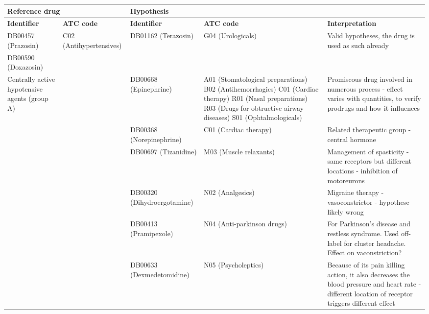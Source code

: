 \begin{table}[htbp]
\scriptsize
\begin{tabular}{|p{2cm}|p{2cm}|p{2cm}|p{2cm}|p{2cm}|}
\hline
\multicolumn{ 2}{|p{2cm}|}{\textbf{Reference drug}} & \multicolumn{ 2}{p{2cm}|}{\textbf{Hypothesis}} &  \\ \hline
\textbf{Identifier} & \textbf{ATC code} & \textbf{Identifier} & \textbf{ATC code} & \textbf{Interpretation} \\ \hline
DB00457 (Prazosin) & \multicolumn{ 1}{p{2cm}|}{C02 (Antihypertensives)} & \multicolumn{ 1}{p{2cm}|}{DB01162 (Terazosin)} & \multicolumn{ 1}{p{2cm}|}{G04 (Urologicals)} & \multicolumn{ 1}{p{2cm}|}{Valid hypotheses, the drug is used as such already} \\ \cline{ 1- 1}
DB00590 (Doxazosin) & \multicolumn{ 1}{p{2cm}|}{} & \multicolumn{ 1}{p{2cm}|}{} & \multicolumn{ 1}{p{2cm}|}{} & \multicolumn{ 1}{p{2cm}|}{} \\ \cline{ 1- 1}\cline{ 3- 5}
\multicolumn{ 1}{|p{2cm}|}{Centrally active hypotensive agents (group A)} & \multicolumn{ 1}{p{2cm}|}{} & DB00668 (Epinephrine) & A01 (Stomatological preparations) 
B02 (Antihemorrhagics)
C01 (Cardiac therapy)
R01 (Nasal preparations)
R03 (Drugs for obtructive airway diseases)
S01 (Ophtalmologicals) & Promiscous drug involved in numerous process - effect varies with quantities, to verify prodrugs and how it influences \\ \cline{ 3- 5}
\multicolumn{ 1}{|p{2cm}|}{} & \multicolumn{ 1}{p{2cm}|}{} & DB00368 (Norepinephrine) & C01 (Cardiac therapy) & Related therapeutic group - central hormone \\ \cline{ 3- 5}
\multicolumn{ 1}{|p{2cm}|}{} & \multicolumn{ 1}{p{2cm}|}{} & DB00697 (Tizanidine) & M03 (Muscle relaxants) & Management of spasticity - same receptors but different locations - inhibition of motoreurons \\ \cline{ 3- 5}
\multicolumn{ 1}{|p{2cm}|}{} & \multicolumn{ 1}{p{2cm}|}{} & DB00320 (Dihydroergotamine) & N02 (Analgesics) & Migraine therapy - vasoconstrictor - hypothese likely wrong \\ \cline{ 3- 5}
\multicolumn{ 1}{|p{2cm}|}{} & \multicolumn{ 1}{p{2cm}|}{} & DB00413 (Pramipexole) & N04 (Anti-parkinson drugs) & For Parkinson's disease and restless syndrome. Used off-label for cluster headache. Effect on vaconstriction? \\ \cline{ 3- 5}
\multicolumn{ 1}{|p{2cm}|}{} & \multicolumn{ 1}{p{2cm}|}{} & DB00633 (Dexmedetomidine) & N05 (Psycholeptics) & Because of its pain killing action, it also decreases the blood pressure and heart rate - different location of receptor triggers different effect \\ \cline{ 3- 5}

\end{tabular}
\end{table}
